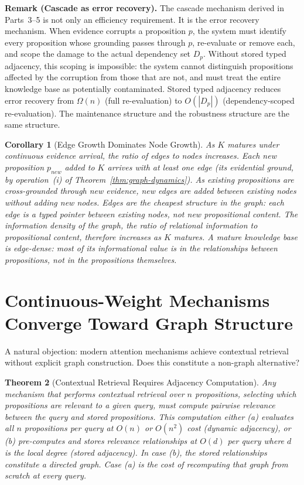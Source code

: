 \documentclass[11pt]{article}
\newtheorem{theorem}{Theorem}
\newtheorem{corollary}[theorem]{Corollary}
\theoremstyle{definition}
\begin{document}
\textbf{Remark (Cascade as error recovery).}
The cascade mechanism derived in Parts~3--5 is not only an
efficiency requirement. It is the error recovery mechanism. When
evidence corrupts a proposition $p$, the system must identify every
proposition whose grounding passes through $p$, re-evaluate or remove
each, and scope the damage to the actual dependency set $D_p$. Without
stored typed adjacency, this scoping is impossible: the system cannot
distinguish propositions affected by the corruption from those that are
not, and must treat the entire knowledge base as potentially
contaminated. Stored typed adjacency reduces error recovery from
$\Omega(n)$ (full re-evaluation) to $O(|D_p|)$ (dependency-scoped
re-evaluation). The maintenance structure and the robustness structure
are the same structure.

\begin{corollary}[Edge Growth Dominates Node Growth]
\label{cor:edge-growth}
As $K$ matures under continuous evidence arrival, the ratio of edges to
nodes increases. Each new proposition $p_{new}$ added to $K$ arrives with
at least one edge (its evidential ground, by operation~(i) of
Theorem~\ref{thm:graph-dynamics}). As existing propositions are
cross-grounded through new evidence, new edges are added between
existing nodes without adding new nodes. Edges are the cheapest
structure in the graph: each edge is a typed pointer between existing
nodes, not new propositional content. The information density of the
graph, the ratio of relational information to propositional content,
therefore increases as $K$ matures. A mature knowledge base is
edge-dense: most of its informational value is in the relationships
between propositions, not in the propositions themselves.
\end{corollary}

\section{Continuous-Weight Mechanisms Converge Toward Graph Structure}
\label{sec:attention}

A natural objection: modern attention mechanisms achieve contextual
retrieval without explicit graph construction. Does this constitute a
non-graph alternative?

\begin{theorem}[Contextual Retrieval Requires Adjacency Computation]
\label{thm:attention}
Any mechanism that performs contextual retrieval over $n$ propositions,
selecting which propositions are relevant to a given query, must
compute pairwise relevance between the query and stored propositions.
This computation either (a) evaluates all $n$ propositions per query at
$O(n)$ or $O(n^2)$ cost (dynamic adjacency), or (b) pre-computes and
stores relevance relationships at $O(d)$ per query where $d$ is the
local degree (stored adjacency). In case (b), the stored relationships
constitute a directed graph. Case (a) is the cost of recomputing that
graph from scratch at every query.
\end{theorem}
\end{document}
